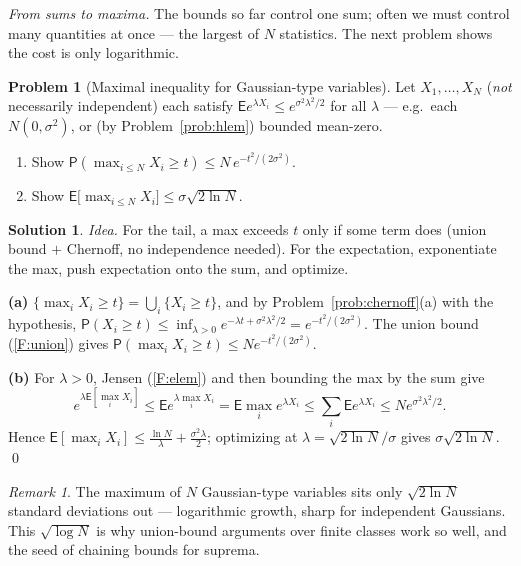 \documentclass[14pt]{extarticle}
\theoremstyle{definition}
\newtheorem{exercise}{Problem}
\newtheorem*{solution}{Solution}
\theoremstyle{remark}
\newtheorem*{remark}{Remark}
\newcommand\expc{\mathsf{E}}
\newcommand\prb{\mathsf{P}}
\begin{document}
\noindent\emph{From sums to maxima.}\; The bounds so far control one sum; often we must control many quantities at once --- the largest of $N$ statistics. The next problem shows the cost is only logarithmic.

\begin{exercise}[Maximal inequality for Gaussian-type variables]\label{prob:maximal}
Let $X_1,\ldots,X_N$ (\emph{not} necessarily independent) each satisfy $\expc e^{\lambda X_i}\le e^{\sigma^2\lambda^2/2}$ for all $\lambda$ --- e.g.\ each $N(0,\sigma^2)$, or (by Problem~\ref{prob:hlem}) bounded mean-zero.
\begin{enumerate}[label=(\alph*)]
\item Show $\prb(\max_{i\le N}X_i\ge t)\le N\,e^{-t^2/(2\sigma^2)}$.
\item Show $\expc\bigl[\max_{i\le N}X_i\bigr]\le\sigma\sqrt{2\ln N}$.
\end{enumerate}
\end{exercise}
\begin{solution}
\emph{Idea.} For the tail, a max exceeds $t$ only if some term does (union bound $+$ Chernoff, no independence needed). For the expectation, exponentiate the max, push expectation onto the sum, and optimize.

\textbf{(a)} $\{\max_iX_i\ge t\}=\bigcup_i\{X_i\ge t\}$, and by Problem~\ref{prob:chernoff}(a) with the hypothesis, $\prb(X_i\ge t)\le\inf_{\lambda>0}e^{-\lambda t+\sigma^2\lambda^2/2}=e^{-t^2/(2\sigma^2)}$. The union bound (\ref{F:union}) gives $\prb(\max_iX_i\ge t)\le N e^{-t^2/(2\sigma^2)}$.

\textbf{(b)} For $\lambda>0$, Jensen (\ref{F:elem}) and then bounding the max by the sum give
\[
e^{\lambda\expc[\max_iX_i]}\le\expc e^{\lambda\max_iX_i}=\expc\max_ie^{\lambda X_i}\le\sum_i\expc e^{\lambda X_i}\le N e^{\sigma^2\lambda^2/2}.
\]
Hence $\expc[\max_iX_i]\le\tfrac{\ln N}\lambda+\tfrac{\sigma^2\lambda}2$; optimizing at $\lambda=\sqrt{2\ln N}/\sigma$ gives $\sigma\sqrt{2\ln N}$. \qed
\end{solution}
\begin{remark}
The maximum of $N$ Gaussian-type variables sits only $\sqrt{2\ln N}$ standard deviations out --- logarithmic growth, sharp for independent Gaussians. This $\sqrt{\log N}$ is why union-bound arguments over finite classes work so well, and the seed of chaining bounds for suprema.
\end{remark}
\end{document}
